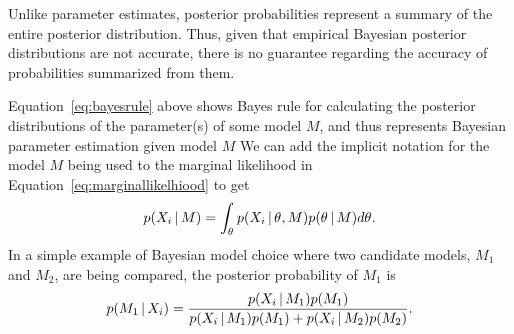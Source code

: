 

Unlike parameter estimates, posterior probabilities represent a summary of the
entire posterior distribution.
Thus, given that empirical Bayesian posterior distributions are not accurate,
there is no guarantee regarding the accuracy of probabilities summarized from
them.

Equation~\ref{eq:bayesrule} above shows Bayes rule for calculating the
posterior distributions of the parameter(s) of some model $M$, and thus
represents Bayesian parameter estimation given model $M$
We can add the implicit notation for the model $M$ being used to
the marginal likelihood in Equation~\ref{eq:marginallikelhiood} to get
\begin{equation}
    p(\alignment{i}{} \given M) = \int_{\myTheta{}} p(\alignment{i}{} \given
    \myTheta{}, M)p(\myTheta{} \given M) d\myTheta{}.
    \label{eq:marginallikelhioodexpanded}
\end{equation}
In a simple example of Bayesian model choice where two candidate models, $M_1$
and $M_2$, are being compared, the posterior probability of $M_1$ is
\begin{equation}
    p(M_1 \given \alignment{i}{}) = \frac{p(\alignment{i}{} \given
    M_1)p(M_1)}{p(\alignment{i}{} \given M_1)p(M_1) + p(\alignment{i}{} \given
    M_2)p(M_2)}.
    \label{eq:bayesmodelchoice}
\end{equation}


